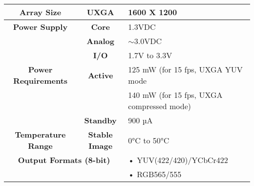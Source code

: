 \begin{table}[]
	\begin{tabular}{|cc|l|}
		\hline
		\multicolumn{1}{|c|}{\textbf{Array Size}}                                                                              & \textbf{UXGA}                    & 1600 X 1200                               \\ \hline
		\multicolumn{1}{|c|}{\textbf{Power Supply}}                                                           & \textbf{Core}                    & 1.3VDC                                    \\ \cline{2-3} 
		\multicolumn{1}{|c|}{}                                                                                                 & \textbf{Analog}                  & $\sim$3.0VDC                              \\ \cline{2-3} 
		\multicolumn{1}{|c|}{}                                                                                                 & \textbf{I/O}                     & 1.7V to 3.3V                              \\ \hline
		\multicolumn{1}{|c|}{\textbf{Power Requirements}}                                                     & {\textbf{Active}} & 125 mW (for 15 fps, UXGA YUV mode         \\ \cline{3-3} 
		\multicolumn{1}{|c|}{}                                                                                                 &                                  & 140 mW (for 15 fps, UXGA compressed mode) \\ \cline{2-3} 
		\multicolumn{1}{|c|}{}                                                                                                 & \textbf{Standby}                 & 900 µA                                    \\ \hline
		\multicolumn{1}{|c|}{\textbf{Temperature Range}}                                                                       & \textbf{Stable Image}            & 0°C to 50°C                               \\ \hline
		\multicolumn{2}{|c|}{\textbf{Output Formats (8-bit)}}                                                                                    & • YUV(422/420)/YCbCr422                   \\ \cline{3-3} 
		\multicolumn{2}{|c|}{}                                                                                                                                    & • RGB565/555                              \\ \cline{3-3} 

\end{tabular}
\end{table}
